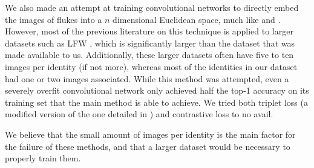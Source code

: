 We also made an attempt at training convolutional networks to directly embed the images of flukes into a $n$ dimensional Euclidean space, much like \cite{schroff2015facenet} and \cite{parkhi2015deep}.
However, most of the previous literature on this technique is applied to larger datasets such as LFW %
, which is significantly larger than the dataset that was made available to us.
Additionally, these larger datasets often have five to ten images per identity (if not more), whereas most of the identities in our dataset had one or two images associated.
While this method was attempted, even a severely overfit convolutional network only achieved half the top-1 accuracy on its training set that the main method is able to achieve.
We tried both triplet loss (a modified version of the one detailed in \cite{schroff2015facenet}) and contrastive loss %
to no avail.

We believe that the small amount of images per identity is the main factor for the failure of these methods, and that a larger dataset would be necessary to properly train them.

